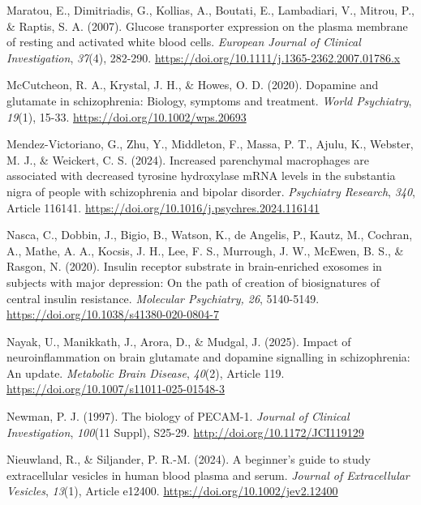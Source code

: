 \documentclass[authordate, empirical, issue]{jote-new-article}
\begin{document}
	Maratou, E., Dimitriadis, G., Kollias, A., Boutati, E., Lambadiari, V., Mitrou, P., \& Raptis, S. A. (2007). Glucose transporter expression on the plasma membrane of resting and activated white blood cells. \emph{European Journal of Clinical Investigation},\emph{ 37}(4), 282-290. \url{https://doi.org/10.1111/j.1365-2362.2007.01786.x}



	McCutcheon, R. A., Krystal, J. H., \& Howes, O. D. (2020). Dopamine and glutamate in schizophrenia: Biology, symptoms and treatment. \emph{World Psychiatry},\emph{ 19}(1), 15-33. \url{https://doi.org/10.1002/wps.20693}



	Mendez-Victoriano, G., Zhu, Y., Middleton, F., Massa, P. T., Ajulu, K., Webster, M. J., \& Weickert, C. S. (2024). Increased parenchymal macrophages are associated with decreased tyrosine hydroxylase mRNA levels in the substantia nigra of people with schizophrenia and bipolar disorder. \emph{Psychiatry Research},\emph{ 340}, Article 116141. \url{https://doi.org/10.1016/j.psychres.2024.116141}



	Nasca, C., Dobbin, J., Bigio, B., Watson, K., de Angelis, P., Kautz, M., Cochran, A., Mathe, A. A., Kocsis, J. H., Lee, F. S., Murrough, J. W., McEwen, B. S., \& Rasgon, N. (2020). Insulin receptor substrate in brain-enriched exosomes in subjects with major depression: On the path of creation of biosignatures of central insulin resistance. \emph{Molecular Psychiatry, 26}, 5140-5149. \url{https://doi.org/10.1038/s41380-020-0804-7}



	Nayak, U., Manikkath, J., Arora, D., \& Mudgal, J. (2025). Impact of neuroinflammation on brain glutamate and dopamine signalling in schizophrenia: An update. \emph{Metabolic Brain Disease},\emph{ 40}(2), Article 119. \url{https://doi.org/10.1007/s11011-025-01548-3}



	Newman, P. J. (1997). The biology of PECAM-1. \emph{Journal of Clinical Investigation},\emph{ 100}(11 Suppl), S25-29. \url{http://doi.org/10.1172/JCI119129}



	Nieuwland, R., \& Siljander, P. R.-M. (2024). A beginner's guide to study extracellular vesicles in human blood plasma and serum. \emph{Journal of Extracellular Vesicles},\emph{ 13}(1), Article e12400. \url{https://doi.org/10.1002/jev2.12400}
\end{document}
